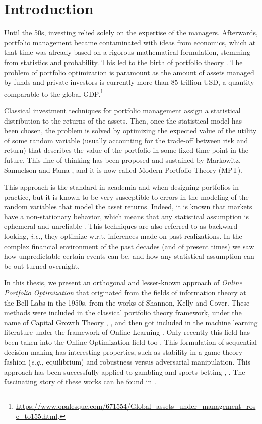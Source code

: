 \chapter{Introduction}

Until the 50s, investing relied solely on the expertise of the managers. Afterwards, portfolio management became contaminated with ideas from economics, which at that time was already based on a rigorous mathematical formulation, stemming from statistics and probability.
This led to the birth of portfolio theory \cite{markowitz1952portfolio}. 
The problem of portfolio optimization is paramount as the amount of assets managed by funds and private investors is currently more than $85$ trillion USD, a quantity comparable to the global GDP.\footnote{\url{https://www.opalesque.com/671554/Global_assets_under_management_rose_to155.html}.}

Classical investment techniques for portfolio management assign a statistical distribution to the returns of the assets. Then, once the statistical model has been chosen, the problem is solved by optimizing the expected value of the utility of some random variable (usually accounting for the trade-off between risk and return) that describes the value of the portfolio in some fixed time point in the future. This line of thinking has been proposed and sustained by Markowitz, Samuelson and Fama \cite{markowitz1952portfolio}, and it is now called Modern Portfolio Theory (MPT). 

This approach is the standard in academia and when designing portfolios in practice, but it is known to be very susceptible to errors in the modeling of the random variables that model the asset returns. 
Indeed, it is known that markets have a non-stationary behavior, which means that any statistical assumption is ephemeral and unreliable \cite{schmitt2013non}. This techniques are also referred to as backward looking, \emph{i.e.}, they optimize w.r.t. inferences made on past realizations. In the complex financial environment of the past decades (and of present times) we saw how unpredictable certain events can be, and how any statistical assumption can be out-turned overnight.

In this thesis, we present an orthogonal and lesser-known approach of \emph{Online Portfolio Optimization} that originated from the fields of information theory at the Bell Labs in the 1950s, from the works of Shannon, Kelly and Cover. These methods were included in the classical portfolio theory framework, under the name of Capital Growth Theory \cite{hakansson1995capital}, \cite{maclean2011kelly}, and then got included in the machine learning literature under the framework of Online Learning \cite{cesa2006prediction}. Only recently this field has been taken into the Online Optimization field too \cite{hazan2016introduction}. This formulation of sequential decision making has interesting properties, such as stability in a game theory fashion (\emph{e.g.}, equilibrium) and robustness versus adversarial manipulation.
This approach has been successfully applied to gambling and sports betting \cite{thorp1966beat}, \cite{hausch1981efficiency}. The fascinating story of these works can be found in \cite{poundstone2010fortune}.

